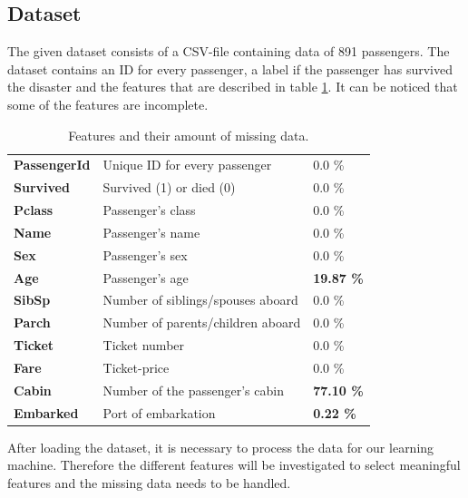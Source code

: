 \subsection{Dataset}
The given dataset consists of a CSV-file containing data of 891 passengers. The dataset contains an ID for every passenger, a label if the passenger has survived the disaster and the features that are described in table \ref{tab:features}. It can be noticed that some of the features are incomplete.

\begin{table}
\caption{Features and their amount of missing data.}
\begin{tabular}{>{\bfseries}l l l}
PassengerId & Unique ID for every passenger & 0.0 \%\\
Survived & Survived (1) or died (0) & 0.0 \% \\
Pclass & Passenger's class & 0.0 \% \\
Name & Passenger's name & 0.0 \% \\
Sex & Passenger's sex & 0.0 \% \\
Age & Passenger's age & \textbf{19.87 \%} \\
SibSp & Number of siblings/spouses aboard & 0.0 \% \\
Parch & Number of parents/children aboard & 0.0 \% \\
Ticket & Ticket number & 0.0 \% \\
Fare & Ticket-price & 0.0 \% \\
Cabin & Number of the passenger's cabin & \textbf{77.10 \%} \\
Embarked & Port of embarkation & \textbf{0.22 \%} \\
\end{tabular}
\centering
\label{tab:features}
\end{table}

After loading the dataset, it is necessary to process the data for our learning machine. Therefore the different features will be investigated to select meaningful features and the missing data needs to be handled.

